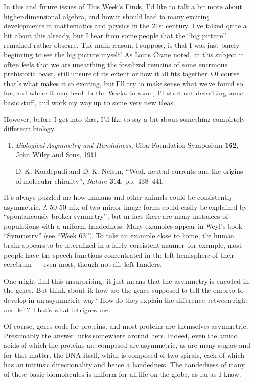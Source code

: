 \documentclass{article}
\begin{document}
In this and future issues of This Week's Finds, I'd like to talk a bit
more about higher-dimensional algebra, and how it should lead to many
exciting developments in mathematics and physics in the 21st century.
I've talked quite a bit about this already, but I hear from some people
that the ``big picture'' remained rather obscure. The main reason, I
suppose, is that I was just barely beginning to see the big picture
myself! As Louis Crane noted, in this subject it often feels that we are
unearthing the fossilized remains of some enormous prehistoric beast,
still unsure of its extent or how it all fits together. Of course that's
what makes it so exciting, but I'll try to make sense what we've found
so far, and where it may lead. In the Weeks to come, I'll start out
describing some basic stuff, and work my way up to some very new ideas.

However, before I get into that, I'd like to say a bit about something
completely different: biology.

\begin{enumerate}
\def\labelenumi{\arabic{enumi})}
\item
  \emph{Biological Asymmetry and Handedness}, Ciba Foundation Symposium
  \textbf{162}, John Wiley and Sons, 1991.

  D. K. Kondepudi and D. K. Nelson, ``Weak neutral currents and the
  origins of molecular chirality'', \emph{Nature} \textbf{314},
  pp.~438--441.
\end{enumerate}

It's always puzzled me how humans and other animals could be
consistently asymmetric. A 50-50 mix of two mirror-image forms could
easily be explained by ``spontaneously broken symmetry'', but in fact
there are many instances of populations with a uniform handedness. Many
examples appear in Weyl's book ``Symmetry'' (see
\protect\hyperlink{week63}{``Week 63''}). To take an example close to
home, the human brain appears to be lateralized in a fairly consistent
manner; for example, most people have the speech functions concentrated
in the left hemisphere of their cerebrum --- even most, though not all,
left-handers.

One might find this unsurprising: it just means that the asymmetry is
encoded in the genes. But think about it: how are the genes supposed to
tell the embryo to develop in an asymmetric way? How do they explain the
difference between right and left? That's what intrigues me.

Of course, genes code for proteins, and most proteins are themselves
asymmetric. Presumably the answer lurks somewhere around here. Indeed,
even the amino acids of which the proteins are composed are asymmetric,
as are many sugars and for that matter, the DNA itself, which is
composed of two spirals, each of which has an intrinsic directionality
and hence a handedness. The handedness of many of these basic
biomolecules is uniform for all life on the globe, as far as I know.
\end{document}
